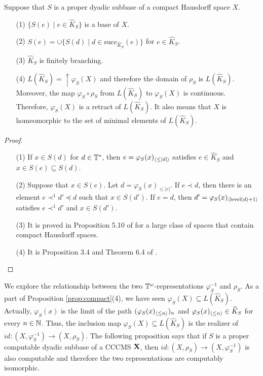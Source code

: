 \documentclass{eptcs-modified}
\begin{document}
\begin{proposition}\label{prop:compact}
Suppose that $S$ is a proper dyadic subbase of a compact Hausdorff space $X$.
\begin{enumerate}
\item[(1)] $\{S(e) \mid e \in \widehat{K}_{S}\}$ is a base of $X$.

\item[(2)] $S(e) = \cup \{S(d) \mid d \in \mathrm{succ}_{\widehat{K}_{S}}(e)\}$ for $e \in \widehat{K}_{S}$.

\item[(3)] $\widehat{K}_{S}$ is finitely branching.

 \item[(4)]
$L(\widehat{K}_{S}) = \uparrow\!\! \varphi_S(X)$ and therefore
the domain of $\rho_S$ is $L(\widehat{K}_{S})$.  Moreover,
the map
$\varphi_S \circ \rho_S$ from $L(\widehat{K}_{S})$ to $\varphi_S(X)$ is continuous.
Therefore, $\varphi_S(X)$ is a retract of $L(\widehat{K}_{S})$.
It also means that
$X$ is homeomorphic to the set of minimal elements of $L(\widehat{K}_{S})$.
\end{enumerate}

\begin{proof}
\begin{enumerate}
\item[(1)] If $x \in S(d)$ for $d \in \mathbb{T}^*$, then $e = {{\varphi_S(x)_{{\langle\leq|d|\rangle}}}}$ satisfies $e \in \widehat{K}_S$ and $x \in S(e) \subseteq S(d)$.

\item[(2)] Suppose that  $x \in S(e)$.  Let $d = \varphi_S(x)_{\leq |e|}$.  If $e \prec d$, then there is an element $e \prec^1 d' \preceq d$
such that $x \in S(d')$.  If $e = d$, then $d' = {{\varphi_S(x)_{{\langle\mathrm{level}(d)+1\rangle}}}}$ satisfies $e \prec^1 d'$  and $x \in S(d')$.

\item[(3)] It is proved in Proposition 5.10 of \cite{tsuiki4} for a large class of spaces that contain
compact Hausdorff spaces.

\item[(4)]  It is Proposition 3.4 and Theorem 6.4 of \cite{tsuiki4}.
\end{enumerate}
\end{proof}
\end{proposition}


We explore the relationship between the two $\mathbb{T}^\omega$-representations
  $\varphi_S^{-1}$ and $\rho_S$.
As a part of Proposition \ref{prop:compact}(4),
we have seen $\varphi_S(X) \subseteq L(\widehat{K}_{S})$.
Actually,  $\varphi_S(x)$ is the limit of the path
$({{\varphi_S(x)_{{\langle\leq n\rangle}}}})_n$ and ${{\varphi_S(x)_{{\langle\leq n\rangle}}}} \in  \widehat{K}_S$ for every $n \in \mathbb{N}$.
Thus, the inclusion map $\varphi_S(X) \subseteq L(\widehat{K}_{S})$
is the realizer of $id: (X, \varphi_S^{-1}) \to (X, \rho_S)$.   The following proposition says that
if $S$ is a proper computable dyadic subbase of a CCCMS $\mathbf{X}$,
then
$id: (X, \rho_S) \to (X, \varphi_S^{-1})$ is also computable and therefore
the two representations are computably isomorphic.
\end{document}
